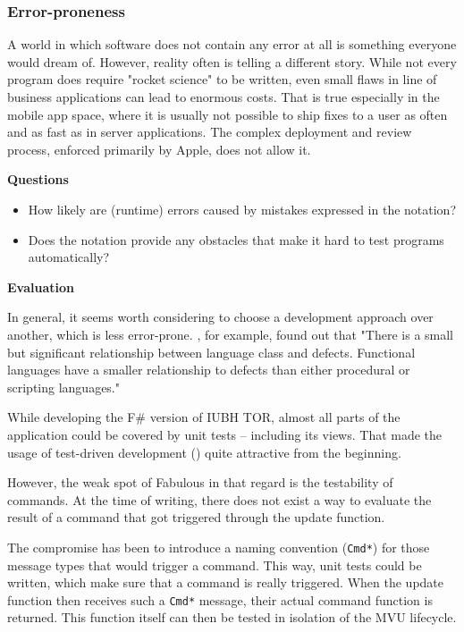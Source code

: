 \subsubsection{Error-proneness}

A world in which software does not contain any error at all is something everyone would dream of. However, reality often is telling a different story. While not every program does require "rocket science" to be written, even small flaws in line of business applications can lead to enormous costs. That is true especially in the mobile app space, where it is usually not possible to ship fixes to a user as often and as fast as in server applications. The complex deployment and review process, enforced primarily by Apple, does not allow it.

\textbf{Questions}

\begin{itemize}
\item How likely are (runtime) errors caused by mistakes expressed in the notation? 
\item Does the notation provide any obstacles that make it hard to test programs automatically? 
\end{itemize}

\textbf{Evaluation}

In general, it seems worth considering to choose a development approach over another, which is less error-prone. \cite{ray_large_2014}, for example, found out that "There is a small but significant relationship between language class and defects. Functional languages have a smaller relationship to defects than either procedural or scripting languages."

While developing the F\# version of IUBH TOR, almost all parts of the application could be covered by unit tests – including its views. That made the usage of test-driven development (\cite{beck_test_2003}) quite attractive from the beginning. 

However, the weak spot of Fabulous in that regard is the testability of commands. At the time of writing, there does not exist a way to evaluate the result of a command that got triggered through the update function. 

The compromise has been to introduce a naming convention (\texttt{Cmd*}) for those message types that would trigger a command. This way, unit tests could be written, which make sure that a command is really triggered. When the update function then receives such a \texttt{Cmd*} message, their actual command function is returned. This function itself can then be tested in isolation of the MVU lifecycle.

